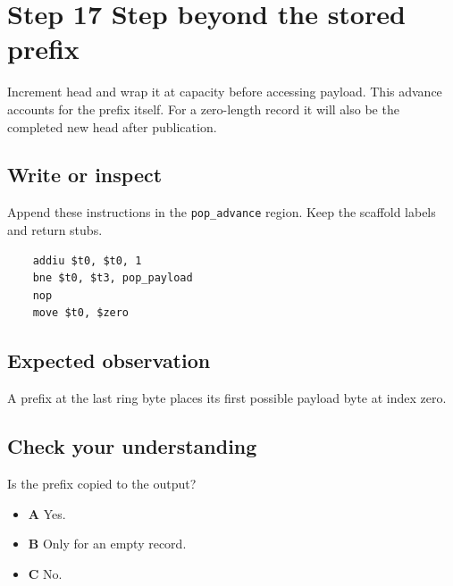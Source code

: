 \section{Step 17 Step beyond the stored prefix}\label{ring-s17}

Increment head and wrap it at capacity before accessing payload. This advance accounts for the prefix itself. For a zero-length record it will also be the completed new head after publication.

\subsection{Write or inspect}
Append these instructions in the \texttt{pop\_advance} region. Keep the scaffold labels and return stubs.

\begin{verbatim}
    addiu $t0, $t0, 1
    bne $t0, $t3, pop_payload
    nop
    move $t0, $zero
\end{verbatim}

\subsection{Expected observation}
A prefix at the last ring byte places its first possible payload byte at index zero.

\subsection{Check your understanding}
Is the prefix copied to the output?

\begin{itemize}
  \item \textbf{A} Yes.
  \item \textbf{B} Only for an empty record.
  \item \textbf{C} No.
\end{itemize}

